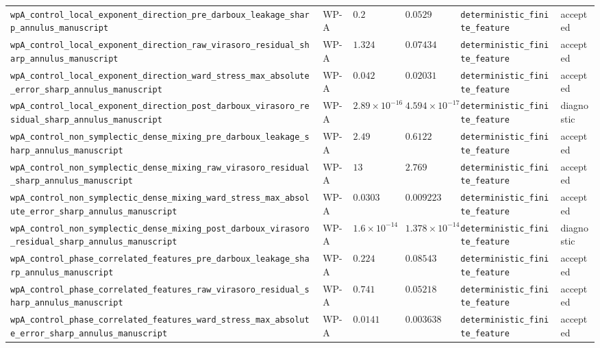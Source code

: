 \begin{table}[t]
\begin{tabular}{@{}llllll@{}}
\texttt{wpA\_control\_local\_exponent\_direction\_pre\_darboux\_leakage\_sharp\_annulus\_manuscript} & WP-A & $0.2$ & $0.0529$ & \texttt{deterministic\_finite\_feature} & accepted \\
\texttt{wpA\_control\_local\_exponent\_direction\_raw\_virasoro\_residual\_sharp\_annulus\_manuscript} & WP-A & $1.324$ & $0.07434$ & \texttt{deterministic\_finite\_feature} & accepted \\
\texttt{wpA\_control\_local\_exponent\_direction\_ward\_stress\_max\_absolute\_error\_sharp\_annulus\_manuscript} & WP-A & $0.042$ & $0.02031$ & \texttt{deterministic\_finite\_feature} & accepted \\
\texttt{wpA\_control\_local\_exponent\_direction\_post\_darboux\_virasoro\_residual\_sharp\_annulus\_manuscript} & WP-A & $2.89\times10^{-16}$ & $4.594\times10^{-17}$ & \texttt{deterministic\_finite\_feature} & diagnostic \\
\texttt{wpA\_control\_non\_symplectic\_dense\_mixing\_pre\_darboux\_leakage\_sharp\_annulus\_manuscript} & WP-A & $2.49$ & $0.6122$ & \texttt{deterministic\_finite\_feature} & accepted \\
\texttt{wpA\_control\_non\_symplectic\_dense\_mixing\_raw\_virasoro\_residual\_sharp\_annulus\_manuscript} & WP-A & $13$ & $2.769$ & \texttt{deterministic\_finite\_feature} & accepted \\
\texttt{wpA\_control\_non\_symplectic\_dense\_mixing\_ward\_stress\_max\_absolute\_error\_sharp\_annulus\_manuscript} & WP-A & $0.0303$ & $0.009223$ & \texttt{deterministic\_finite\_feature} & accepted \\
\texttt{wpA\_control\_non\_symplectic\_dense\_mixing\_post\_darboux\_virasoro\_residual\_sharp\_annulus\_manuscript} & WP-A & $1.6\times10^{-14}$ & $1.378\times10^{-14}$ & \texttt{deterministic\_finite\_feature} & diagnostic \\
\texttt{wpA\_control\_phase\_correlated\_features\_pre\_darboux\_leakage\_sharp\_annulus\_manuscript} & WP-A & $0.224$ & $0.08543$ & \texttt{deterministic\_finite\_feature} & accepted \\
\texttt{wpA\_control\_phase\_correlated\_features\_raw\_virasoro\_residual\_sharp\_annulus\_manuscript} & WP-A & $0.741$ & $0.05218$ & \texttt{deterministic\_finite\_feature} & accepted \\
\texttt{wpA\_control\_phase\_correlated\_features\_ward\_stress\_max\_absolute\_error\_sharp\_annulus\_manuscript} & WP-A & $0.0141$ & $0.003638$ & \texttt{deterministic\_finite\_feature} & accepted \\

\end{tabular}
\end{table}

